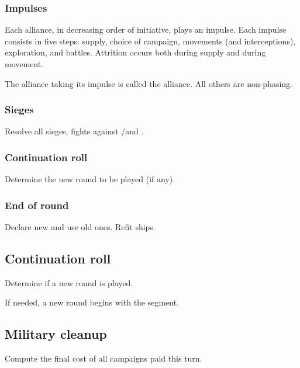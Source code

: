 \subsubsection{Impulses}
Each alliance, in decreasing order of initiative, plays an impulse. Each
impulse consists in five steps: supply, choice of campaign, movements (and
interceptions), exploration, and battles. Attrition occurs both during supply
and during movement.

The alliance taking its impulse is called the  alliance. All
others are non-phasing.

\subsubsection{Sieges}
Resolve all sieges, fights against \REVOLT/\REBELLION and \corsaire.

\subsubsection{Continuation roll}
Determine the new round to be played (if any).

\subsubsection{End of round}
Declare new  and use old ones. Refit 
ships.

\subsection{Continuation roll}
Determine if a new round is played.

If needed, a new round begins with the  segment.

\subsection{Military cleanup}
Compute the final cost of all campaigns paid this turn.

